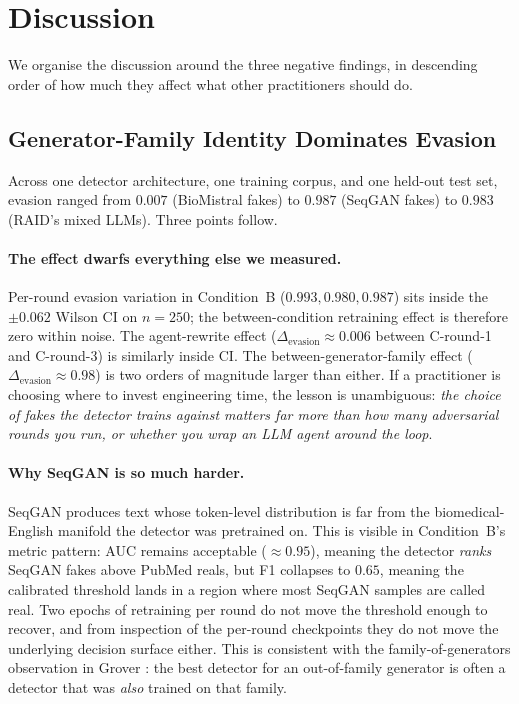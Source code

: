 \documentclass[conference]{IEEEtran}
\begin{document}
\section{Discussion}
\label{sec:discussion}

We organise the discussion around the three negative findings, in
descending order of how much they affect what other practitioners should
do.

\subsection{Generator-Family Identity Dominates Evasion}
\label{ssec:family_disc}

Across one detector architecture, one training corpus, and one held-out
test set, evasion ranged from \(0.007\) (BioMistral fakes) to
\(0.987\) (SeqGAN fakes) to \(0.983\) (RAID's mixed LLMs). Three
points follow.

\paragraph{The effect dwarfs everything else we measured.}
Per-round evasion variation in Condition~B (\(0.993, 0.980, 0.987\))
sits inside the \(\pm 0.062\) Wilson CI on \(n=250\); the
between-condition retraining effect is therefore zero within noise. The
agent-rewrite effect (\(\Delta_{\mathrm{evasion}} \approx 0.006\) between
C-round-1 and C-round-3) is similarly inside CI. The
between-generator-family effect (\(\Delta_{\mathrm{evasion}}
\approx 0.98\)) is two orders of magnitude larger than either. If a
practitioner is choosing where to invest engineering time, the lesson is
unambiguous: \emph{the choice of fakes the detector trains against
matters far more than how many adversarial rounds you run, or whether
you wrap an LLM agent around the loop}.

\paragraph{Why SeqGAN is so much harder.}
SeqGAN produces text whose token-level distribution is far from the
biomedical-English manifold the detector was pretrained on. This is
visible in Condition~B's metric pattern: AUC remains acceptable
(\(\approx 0.95\)), meaning the detector \emph{ranks} SeqGAN fakes
above PubMed reals, but F1 collapses to \(0.65\), meaning the
calibrated threshold lands in a region where most SeqGAN samples are
called real. Two epochs of retraining per round do not move the
threshold enough to recover, and from inspection of the per-round
checkpoints they do not move the underlying decision surface either.
This is consistent with the family-of-generators observation in
Grover \cite{zellers2019defending}: the best detector for an
out-of-family generator is often a detector that was \emph{also}
trained on that family.
\end{document}
